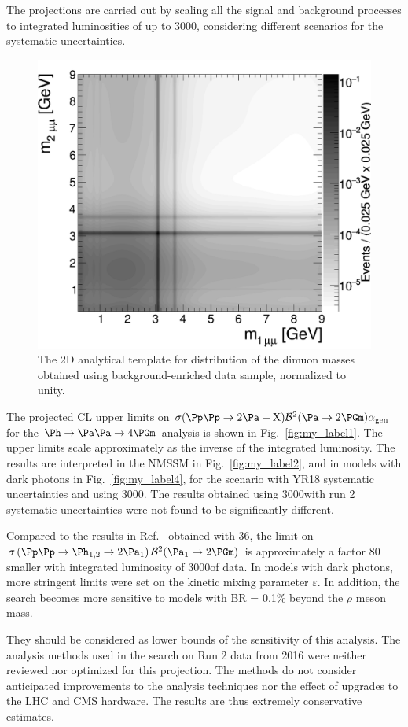 The projections are carried out by scaling all the signal and background processes to integrated luminosities of up to 3000\fbinv, considering different scenarios for the
systematic uncertainties. 


\begin{figure}[tb]
\begin{center}
\includegraphics[width=0.52\linewidth]{plots/h2_background.png}
\end{center}
\caption{The 2D analytical template for distribution of the dimuon masses obtained using background-enriched data sample, normalized to unity. \label{fig:2dtemplate}}
\end{figure}

The projected CL upper limits on ${\sigma(\Pp\Pp \to 2 \Pa + \PX)  \mathcal{B}^2 (\Pa \to 2\PGm)  \alphaGen}$ for the $\Ph\to\Pa\Pa\to4\PGm$ analysis is shown in Fig.~\ref{fig:my_label1}. The upper limits scale approximately as the inverse of the integrated luminosity. The results are interpreted in the NMSSM in Fig.~\ref{fig:my_label2}, and in models with dark photons in Fig.~\ref{fig:my_label4}, for the scenario with YR18 systematic uncertainties and using 3000\fbinv. The results obtained using 3000\fbinv with run 2 systematic uncertainties were not found to be significantly different.

Compared to the results in Ref.~\cite{CMS-PAS-HIG-18-003} obtained with 36\fbinv, the limit on $\sigma \left( \Pp\Pp \to \PhOneTwo \to 2 \PaOne \right) \mathcal{B}^2(\PaOne \to 2\PGm)$ is approximately a factor 80 smaller with integrated luminosity of 3000\fbinv of data. In models with dark photons, more stringent limits were set on the kinetic mixing parameter $\varepsilon$. In addition, the search becomes more sensitive to models with BR = 0.1\% beyond the $\rho$ meson mass.


They should be considered as lower bounds of the sensitivity of this analysis. The analysis methods used in the search on Run 2 data from 2016 were neither reviewed nor optimized for this projection. The methods do not consider anticipated improvements to the analysis techniques nor the effect of upgrades to the LHC and CMS hardware. The results are thus extremely conservative estimates.

